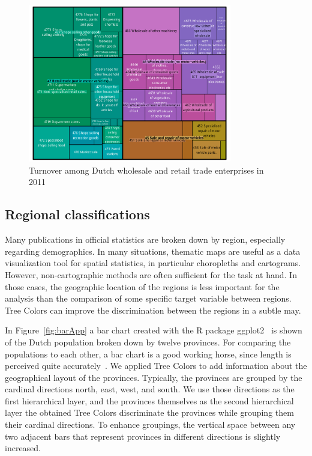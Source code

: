 \documentclass[journal]{vgtc}                %
\begin{document}
\begin{figure}[!t]
  \centering
  \includegraphics[width=3.5in]{TMbusiness.pdf}
  \caption{Turnover among Dutch wholesale and retail trade enterprises in 2011}\label{fig:treemapApp}
\end{figure}

\subsection{Regional classifications}
Many publications in official statistics are broken down by region, especially regarding demographics.
In many situations, thematic maps are useful as a data visualization tool for spatial statistics, in particular choropleths and cartograms. However, non-cartographic methods are often sufficient for the task at hand. In those cases, the geographic location of the regions is less important for the analysis than the comparison of some specific target variable between regions. Tree Colors can improve the discrimination between the regions in a subtle may.

In Figure~\ref{fig:barApp} a bar chart created with the R package ggplot2~\cite{ggplot2} is shown of the Dutch population broken down by twelve provinces. For comparing the populations to each other, a bar chart is a good working horse, since length is perceived quite accurately~\cite{Mackinlay1986}. We applied Tree Colors to add information about the geographical layout of the provinces. Typically, the provinces are grouped by the cardinal directions north, east, west, and south. We use those directions as the first hierarchical layer, and the provinces themselves as the second hierarchical layer the obtained Tree Colors discriminate the provinces while grouping them their cardinal directions. To enhance groupings, the vertical space between any two adjacent bars that represent provinces in different directions is slightly increased.
\end{document}
